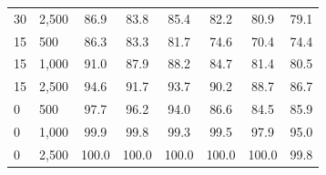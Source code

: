 \documentclass[twoside,11pt]{article}\usepackage[]{graphicx}\usepackage[]{xcolor}
\newenvironment{knitrout}{}{} %
\begin{document}
\begin{knitrout}
\begin{landscape}
\begin{longtable}[t]{llcccccc}
\hspace{1em}30 & 2,500 & 86.9 & 83.8 & 85.4 & 82.2 & 80.9 & 79.1\\
\hspace{1em}15 & 500 & 86.3 & 83.3 & 81.7 & 74.6 & 70.4 & 74.4\\
\hspace{1em}15 & 1,000 & 91.0 & 87.9 & 88.2 & 84.7 & 81.4 & 80.5\\
\hspace{1em}15 & 2,500 & 94.6 & 91.7 & 93.7 & 90.2 & 88.7 & 86.7\\
\hspace{1em}0 & 500 & 97.7 & 96.2 & 94.0 & 86.6 & 84.5 & 85.9\\
\hspace{1em}0 & 1,000 & 99.9 & 99.8 & 99.3 & 99.5 & 97.9 & 95.0\\
\hspace{1em}0 & 2,500 & 100.0 & 100.0 & 100.0 & 100.0 & 100.0 & 99.8\\*
\end{longtable}
\end{landscape}

\end{knitrout}


\vskip 0.2in

\end{document}
